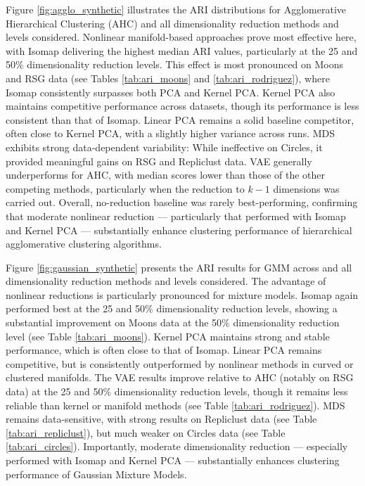 \documentclass[preprint,12pt]{elsarticle}
\begin{document}
Figure \ref{fig:agglo_synthetic} illustrates the ARI distributions for Agglomerative Hierarchical Clustering (AHC) and all dimensionality reduction methods and levels considered. Nonlinear manifold-based approaches prove most effective here, with Isomap delivering the highest median ARI values, particularly at the 25 and 50\% dimensionality reduction levels. This effect is most pronounced on Moons and RSG data (see Tables \ref{tab:ari_moons} and \ref{tab:ari_rodriguez}), where Isomap consistently surpasses both PCA and Kernel PCA. Kernel PCA also maintains competitive performance across datasets, though its performance is less consistent than that of Isomap. Linear PCA remains a solid baseline competitor, often close to Kernel PCA, with a slightly higher variance across runs. MDS exhibits strong data-dependent variability: While ineffective on Circles, it provided meaningful gains on RSG and Repliclust data. VAE generally underperforms for AHC, with median scores lower than those of the other competing methods, particularly when the reduction to $k-1$ dimensions was carried out. Overall, no-reduction baseline was rarely best-performing, confirming that moderate nonlinear reduction — particularly that performed with Isomap and Kernel PCA — substantially enhance clustering performance of hierarchical agglomerative clustering algorithms.


Figure \ref{fig:gaussian_synthetic} presents the ARI results for GMM across and all dimensionality reduction methods and levels considered. The advantage of nonlinear reductions is particularly pronounced for mixture models. Isomap again performed best at the 25 and 50\% dimensionality reduction levels, showing a substantial improvement on Moons data at the 50\% dimensionality reduction level (see Table \ref{tab:ari_moons}). Kernel PCA maintains strong and stable performance, which is often close to that of Isomap. Linear PCA remains competitive, but is consistently outperformed by nonlinear methods in curved or clustered manifolds. The VAE results improve relative to AHC (notably on RSG data) at the 25 and 50\% dimensionality reduction levels, though it remains less reliable than kernel or manifold methods (see Table \ref{tab:ari_rodriguez}). MDS remains data-sensitive, with strong results on Repliclust data (see Table \ref{tab:ari_repliclust}), but much weaker on Circles data (see Table \ref{tab:ari_circles}). Importantly, moderate dimensionality reduction — especially performed with Isomap and Kernel PCA — substantially enhances clustering performance of Gaussian Mixture Models.
\end{document}
